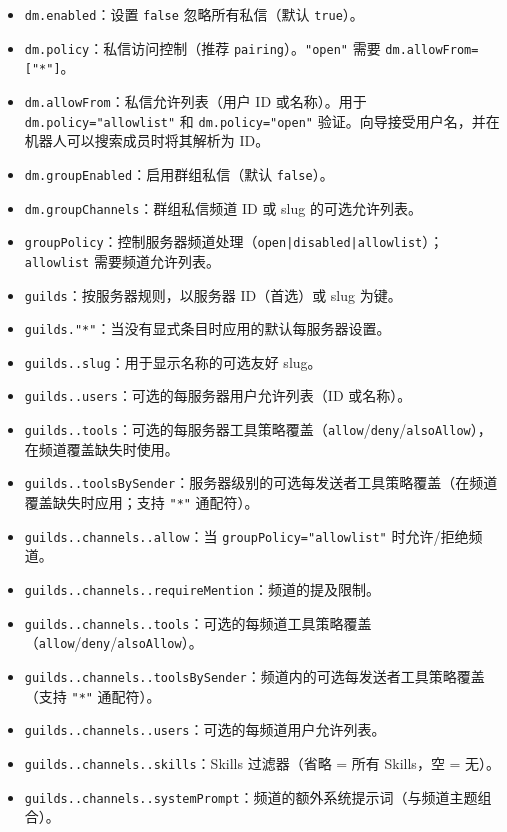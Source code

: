 \begin{itemize}
  \item \texttt{dm.enabled}：设置 \texttt{false} 忽略所有私信（默认 \texttt{true}）。
  \item \texttt{dm.policy}：私信访问控制（推荐 \texttt{pairing}）。\texttt{"open"} 需要 \texttt{dm.allowFrom=["*"]}。
  \item \texttt{dm.allowFrom}：私信允许列表（用户 ID 或名称）。用于 \texttt{dm.policy="allowlist"} 和 \texttt{dm.policy="open"} 验证。向导接受用户名，并在机器人可以搜索成员时将其解析为 ID。
  \item \texttt{dm.groupEnabled}：启用群组私信（默认 \texttt{false}）。
  \item \texttt{dm.groupChannels}：群组私信频道 ID 或 slug 的可选允许列表。
  \item \texttt{groupPolicy}：控制服务器频道处理（\texttt{open|disabled|allowlist}）；\texttt{allowlist} 需要频道允许列表。
  \item \texttt{guilds}：按服务器规则，以服务器 ID（首选）或 slug 为键。
  \item \texttt{guilds."*"}：当没有显式条目时应用的默认每服务器设置。
  \item \texttt{guilds..slug}：用于显示名称的可选友好 slug。
  \item \texttt{guilds..users}：可选的每服务器用户允许列表（ID 或名称）。
  \item \texttt{guilds..tools}：可选的每服务器工具策略覆盖（\texttt{allow}/\texttt{deny}/\texttt{alsoAllow}），在频道覆盖缺失时使用。
  \item \texttt{guilds..toolsBySender}：服务器级别的可选每发送者工具策略覆盖（在频道覆盖缺失时应用；支持 \texttt{"*"} 通配符）。
  \item \texttt{guilds..channels..allow}：当 \texttt{groupPolicy="allowlist"} 时允许/拒绝频道。
  \item \texttt{guilds..channels..requireMention}：频道的提及限制。
  \item \texttt{guilds..channels..tools}：可选的每频道工具策略覆盖（\texttt{allow}/\texttt{deny}/\texttt{alsoAllow}）。
  \item \texttt{guilds..channels..toolsBySender}：频道内的可选每发送者工具策略覆盖（支持 \texttt{"*"} 通配符）。
  \item \texttt{guilds..channels..users}：可选的每频道用户允许列表。
  \item \texttt{guilds..channels..skills}：Skills 过滤器（省略 = 所有 Skills，空 = 无）。
  \item \texttt{guilds..channels..systemPrompt}：频道的额外系统提示词（与频道主题组合）。

\end{itemize}
